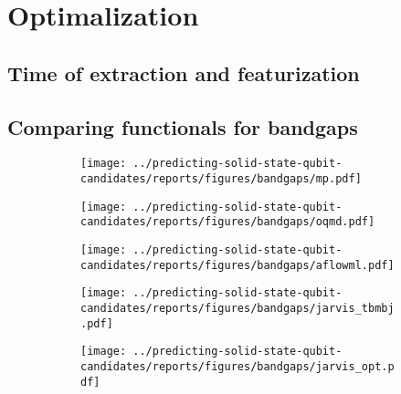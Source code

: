 \chapter{Optimalization}

\section{Time of extraction and featurization}


\section{Comparing functionals for bandgaps}


\clearpage
\begin{figure}[ht!]
    \centering
    \begin{subfigure}[t]{1\textwidth}
        \centering
        \texttt{[image: ../predicting-solid-state-qubit-candidates/reports/figures/bandgaps/mp.pdf]}
        \caption{}
    \end{subfigure}%

    \begin{subfigure}[t]{1\textwidth}
        \centering
        \texttt{[image: ../predicting-solid-state-qubit-candidates/reports/figures/bandgaps/oqmd.pdf]}
        \caption{}
    \end{subfigure}

    \begin{subfigure}[t]{1\textwidth}
        \centering
        \texttt{[image: ../predicting-solid-state-qubit-candidates/reports/figures/bandgaps/aflowml.pdf]}
        \caption{}
    \end{subfigure}
\end{figure}

\begin{figure}[t!]\ContinuedFloat
    \centering
    \begin{subfigure}[t]{1\textwidth}
        \centering
        \texttt{[image: ../predicting-solid-state-qubit-candidates/reports/figures/bandgaps/jarvis\_tbmbj.pdf]}
        \caption{}
    \end{subfigure}%

    \begin{subfigure}[t]{1\textwidth}
        \centering
        \texttt{[image: ../predicting-solid-state-qubit-candidates/reports/figures/bandgaps/jarvis\_opt.pdf]}
        \caption{}
    \end{subfigure}
    \caption{}
\end{figure}

